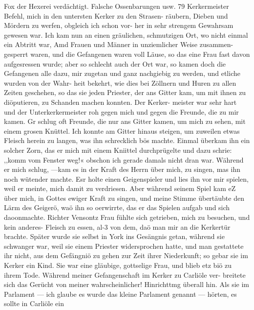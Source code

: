 {%
Fox der Hexerei verdächtigt. Falsche Ossenbarungen usw. 79
Kerkermeister Befehl, mich in den untersten Kerker zu den Strasen-
räubern, Dieben und Mördern zu werfen, obgleich ich schon vor-
her in sehr strengem Gewahrsam gewesen war. Ich kam nun
an einen gräulichen, schmutzigen Ort, wo nicht einmal ein Abtritt
war, Amd Frauen und Männer in unziemlicher Weise zusammen-
gesperrt waren, und die Gefangenen waren voll Läuse, so das eine
Frau fast davon aufgesressen wurde; aber so schlecht auch der
Ort war, so kamen doch die Gefangenen alle dazu, mir zugetan
und ganz nachgiebig zu werden, und etliche wurden von der Wahr-
heit bekehrt, wie dies bei Zöllnern und Huren zu allen Zeiten
geschehen, so das sie jeden Priester, der ans Gitter kam, um mit
ihnen zu diöputieren, zu Schanden machen konnten. Der Kerker-
meister war sehr hart und der Unterkerkermeister roh gegen mich und
gegen die Freunde, die zu mir kamen. Gr schlug oft Freunde,
die nur ans Gitter kamen, um mich zu sehen, mit einem grosen
Knüttel. Ich konnte am Gitter hinaus steigen, um zuweilen etwas
Fleisch herein zu langen, was ihn schrecklich bös machte. Einmal
überkam ihn ein solcher Zorn, das er mich mit einem Kniittel
durchprügelte und dazu schrie: ,,komm vom Fenster weg!« obschon
ich gerade damals nicht dran war. Während er mich schlug,
—kam es in der Kraft des Herrn über mich, zu singen, mas ihn
noch wütender machte. Esr holte einen Geigenspieler und lies
ihn vor mir spielen, weil er meinte, mich damit zu verdriesen.
Aber während seinem Spiel kam eZ über mich, in Gottes ewiger
Kraft zu singen, und meine Stimme übertäubte den Lärm des
Geigerö, waö ihn so oerwirrte, das er das Spielen aufgab und
sich daoonmachte.
Richter Vensontz Frau fühlte sich getrieben, mich zu besuchen,
und kein anderes- Fleisch zu essen, al-3 von dem, daö man mir
an die Kerkertür brachte. Später wurde sie selbst in York ins
Gesängnis getan, während sie schwanger war, weil sie einem
Priester widersprochen hatte, und man gestattete ihr nicht, aus
dem Gefängniö zu gehen zur Zeit ihrer Niederkunft; so gebar
sie im Kerker ein Kind. Sie war eine gläubige, gottselige Frau,
und blieb etz biö zu ihrem Tode.
Während meiner Gefangenschaft im Kerker zu Carliöle ver-
breitete sich das Gerücht von meiner wahrscheinlicher! Hinrichttmg
überall hin. Als sie im Parlament — ich glaube es wurde das
kleine Parlament genannt — hörten, es sollte in Carliöle ein


}

